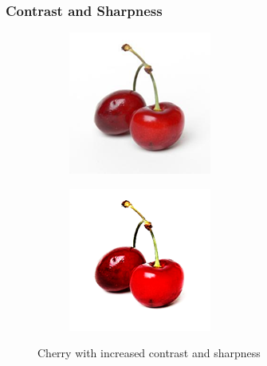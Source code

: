 \documentclass[../main.tex]{subfiles}
\begin{document}
\subsubsection{Contrast and Sharpness}

\begin{figure}[h!]
  \centering
  \begin{subfigure}[b]{0.2\linewidth}
    \includegraphics[width=\linewidth]{original.png}
  \end{subfigure}
  \begin{subfigure}[b]{0.2\linewidth}
    \includegraphics[width=\linewidth]{edited.png}
  \end{subfigure}
  \caption{Cherry with increased contrast and sharpness}
  \label{fig:contrast-edit}
\end{figure}
\end{document}
